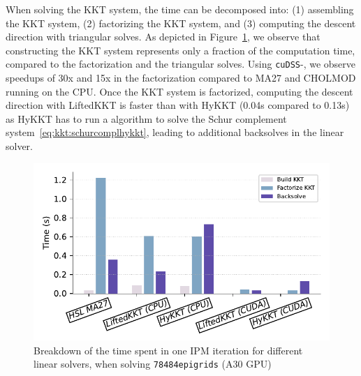 When solving the KKT system, the time can be decomposed into: (1) assembling the
KKT system, (2) factorizing the KKT system, and (3) computing the descent direction with triangular solves.
As depicted in Figure~\ref{fig:timebreakdown}, we observe
that constructing the KKT system represents only a fraction of the computation time, compared
to the factorization and the triangular solves. Using {\tt cuDSS}-\ldlt, we observe speedups of
30x and 15x in the factorization compared to MA27 and CHOLMOD running on the CPU.
Once the KKT system is factorized, computing the descent direction with LiftedKKT is faster than with HyKKT
(0.04s compared to 0.13s) as HyKKT has to run a \CG algorithm to solve the Schur complement
system~\eqref{eq:kkt:schurcomplhykkt}, leading to additional backsolves
in the linear solver.

\begin{figure}[!ht]
  \centering
  \includegraphics[width=.7\textwidth]{figures/breakdown.pdf}
  \caption{Breakdown of the time spent in one IPM iteration
    for different linear solvers, when solving {\tt 78484epigrids} (A30 GPU)
  \label{fig:timebreakdown}}
\end{figure}



